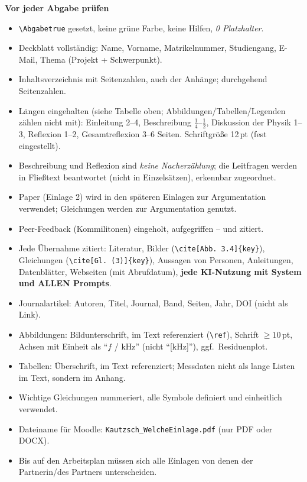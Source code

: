 \textbf{Vor jeder Abgabe prüfen}
\begin{itemize}\itemsep0pt
\item \texttt{\textbackslash Abgabetrue} gesetzt, keine grüne Farbe, keine Hilfen, \emph{0 Platzhalter}.
\item Deckblatt vollständig: Name, Vorname, Matrikelnummer, Studiengang, E-Mail, Thema (Projekt + Schwerpunkt).
\item Inhaltsverzeichnis mit Seitenzahlen, auch der Anhänge; durchgehend Seitenzahlen.
\item Längen eingehalten (siehe Tabelle oben; Abbildungen/Tabellen/Legenden zählen nicht mit):
      Einleitung 2--4, Beschreibung $\tfrac14$--$\tfrac12$, Diskussion der Physik 1--3,
      Reflexion 1--2, Gesamtreflexion 3--6 Seiten. Schriftgröße 12\,pt (fest eingestellt).
\item Beschreibung und Reflexion sind \emph{keine Nacherzählung}; die Leitfragen werden in Fließtext
      beantwortet (nicht in Einzelsätzen), erkennbar zugeordnet.
\item Paper (Einlage 2) wird in den späteren Einlagen zur Argumentation verwendet; Gleichungen werden
      zur Argumentation genutzt.
\item Peer-Feedback (Kommilitonen) eingeholt, aufgegriffen -- und zitiert.
\item Jede Übernahme zitiert: Literatur, Bilder (\texttt{\textbackslash cite[Abb.~3.4]\{key\}}),
      Gleichungen (\texttt{\textbackslash cite[Gl.~(3)]\{key\}}), Aussagen von Personen, Anleitungen,
      Datenblätter, Webseiten (mit Abrufdatum), \textbf{jede KI-Nutzung mit System und ALLEN Prompts}.
\item Journalartikel: Autoren, Titel, Journal, Band, Seiten, Jahr, DOI (nicht als Link).
\item Abbildungen: Bildunterschrift, im Text referenziert (\texttt{\textbackslash ref}), Schrift
      $\geq 10$\,pt, Achsen mit Einheit als \enquote{$f$ / kHz} (nicht \enquote{[kHz]}), ggf.\ Residuenplot.
\item Tabellen: Überschrift, im Text referenziert; Messdaten nicht als lange Listen im Text, sondern im Anhang.
\item Wichtige Gleichungen nummeriert, alle Symbole definiert und einheitlich verwendet.
\item Dateiname für Moodle: \texttt{Kautzsch\_WelcheEinlage.pdf} (nur PDF oder DOCX).
\item Bis auf den Arbeitsplan müssen sich alle Einlagen von denen der Partnerin/des Partners unterscheiden.
\end{itemize}
